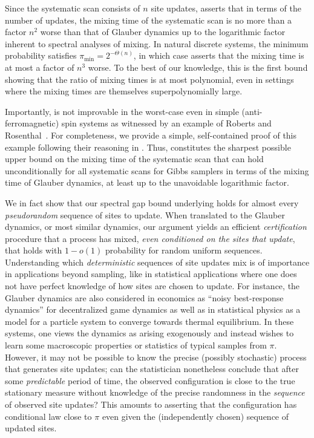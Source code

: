 \documentclass[11pt]{article}
\begin{document}
Since the systematic scan consists of $n$ site updates,  asserts that in terms of the number of updates, the mixing time of the systematic scan is no more than a factor $n^2$ worse than that of Glauber dynamics up to the logarithmic factor inherent to spectral analyses of mixing. In natural discrete systems, the minimum probability satisfies $\pi_{\min}= 2^{-\Theta(n)}$, in which case  asserts that the mixing time is at most a factor of $n^3$ worse. To the best of our knowledge, this is the first bound showing that the ratio of mixing times is at most polynomial, even in settings where the mixing times are themselves superpolynomially large.

Importantly,  is not improvable in the worst-case even in simple (anti-ferromagnetic) spin systems as witnessed by an example of Roberts and Rosenthal~\cite{roberts2015surprising}. For completeness, we provide a simple, self-contained proof of this example following their reasoning in . Thus,  constitutes the sharpest possible upper bound on the mixing time of the systematic scan that can hold unconditionally for all systematic scans for Gibbs samplers in terms of the mixing time of Glauber dynamics, at least up to the unavoidable logarithmic factor.

We in fact show that our spectral gap bound underlying  holds for almost every \emph{pseudorandom} sequence of sites to update. When translated to the Glauber dynamics, or most similar dynamics, our argument yields an efficient \emph{certification} procedure that a process has mixed, \emph{even conditioned on the sites that update}, that holds with $1-o(1)$ probability for random uniform sequences. Understanding which \emph{deterministic} sequences of site updates mix is of importance in applications beyond sampling, like in statistical applications where one does not have perfect knowledge of how sites are chosen to update. For instance, the Glauber dynamics are also considered in economics as ``noisy best-response dynamics'' for decentralized game dynamics \cite{kandori,BLUME1993387,young} as well as in statistical physics as a model for a particle system to converge towards thermal equilibrium. In these systems, one views the dynamics as arising exogenously and instead wishes to learn some macroscopic properties or statistics of typical samples from $\pi$. However, it may not be possible to know the precise (possibly stochastic) process that generates site updates; can the statistician nonetheless conclude that after some \emph{predictable} period of time, the observed configuration is close to the true stationary measure without knowledge of the precise randomness in the \emph{sequence} of observed site updates? This amounts to asserting that the configuration has conditional law close to $\pi$ even given the (independently chosen) sequence of updated sites.
\end{document}
